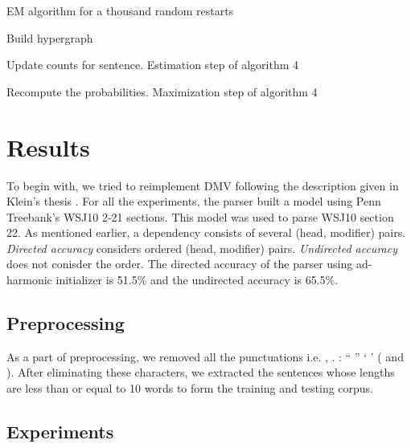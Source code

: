 \documentclass{book}
\begin{document}
\begin{algorithm}

\caption{EM algorithm for a thousand random restarts}

\begin{algorithmic}



      \State Build hypergraph


         \State Update counts for sentence. Estimation step of algorithm 4

      \EndFor

   \EndFor


    \State Recompute the probabilities. Maximization step of algorithm 4

  \EndFor

\EndFor

\end{algorithmic}
\end{algorithm}

\chapter{Results}

To begin with, we tried to reimplement DMV following the description given in Klein's thesis \citep{klein2004}. For all the experiments, the parser built a model using Penn Treebank's WSJ10 2-21 sections. This model was used to parse WSJ10 section 22. As mentioned earlier, a dependency consists of several (head, modifier) pairs. \textit{Directed accuracy} considers ordered (head, modifier) pairs. \textit{Undirected accuracy} does not conisder the order. The directed accuracy of the parser using ad-harmonic initializer is 51.5\% and the undirected accuracy is 65.5\%.

\section{Preprocessing}

As a part of preprocessing, we removed all the punctuations i.e. , . : `` '' ` ' ( and ). After eliminating these characters, we extracted the sentences whose lengths are less than or equal to 10 words to form the training and testing corpus.

\section{Experiments}
\end{document}
